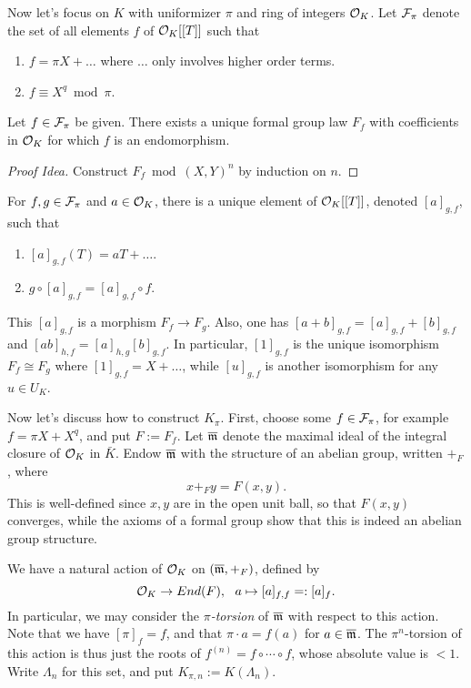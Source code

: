 Now let's focus on $K$ with uniformizer $\pi$ and ring of integers $\mathcal{O}_{K}$.
Let $\mathcal{F}_{\pi}$ denote the set of all elements $f$ of $\mathcal{O}_{K}[[T]]$ such that
\begin{enumerate}
  \item $f = \pi X + \ldots$ where $\ldots$ only involves higher order terms.
  \item $f \equiv X^{q} \bmod \pi$.
\end{enumerate}

\begin{theorem}
  Let $f \in \mathcal{F}_{\pi}$ be given.
  There exists a unique formal group law $F_{f}$ with coefficients in $\mathcal{O}_{K}$ for which $f$ is an endomorphism.
\end{theorem}
\begin{proof}[Proof Idea]
  Construct $F_{f} \bmod (X,Y)^{n}$ by induction on $n$.
\end{proof}

\begin{proposition}
  For $f,g \in \mathcal{F}_{\pi}$ and $a \in \mathcal{O}_{K}$, there is a unique element of $\mathcal{O}_{K}[[T]]$, denoted $[a]_{g,f}$, such that
  \begin{enumerate}
    \item $[a]_{g,f}(T) = aT + \ldots$.
    \item $g \circ [a]_{g,f} = [a]_{g,f} \circ f$.
  \end{enumerate}
  This $[a]_{g,f}$ is a morphism $F_{f} \to F_{g}$.
  Also, one has $[a+b]_{g,f} = [a]_{g,f} + [b]_{g,f}$ and $[ab]_{h,f} = [a]_{h,g}[b]_{g,f}$.
  In particular, $[1]_{g,f}$ is the unique isomorphism $F_{f} \cong F_{g}$ where $[1]_{g,f} = X + \ldots$, while $[u]_{g,f}$ is another isomorphism for any $u \in U_{K}$.
\end{proposition}

Now let's discuss how to construct $K_{\pi}$.
First, choose some $f \in \mathcal{F}_{\pi}$, for example $f = \pi X + X^{q}$, and put $F := F_{f}$.
Let $\overline{\mathfrak{m}}$ denote the maximal ideal of the integral closure of $\mathcal{O}_{K}$ in $\bar K$.
Endow $\overline{\mathfrak{m}}$ with the structure of an abelian group, written $+_{F}$, where
\[ x +_{F} y = F(x,y). \]
This is well-defined since $x,y$ are in the open unit ball, so that $F(x,y)$ converges, while the axioms of a formal group show that this is indeed an abelian group structure.

We have a natural action of $\mathcal{O}_{K}$ on $(\overline{\mathfrak{m}},+_{F})$, defined by
\[ \mathcal{O}_{K} \to End(F), \ \ a \mapsto [a]_{f,f} =: [a]_{f}. \]
In particular, we may consider the \emph{$\pi$-torsion} of $\overline{\mathfrak{m}}$ with respect to this action.
Note that we have $[\pi]_{f} = f$, and that $\pi \cdot a = f(a)$ for $a \in \overline {\mathfrak{m}}$.
The $\pi^{n}$-torsion of this action is thus just the roots of $f^{(n)} = f \circ \cdots \circ f$, whose absolute value is $< 1$.
Write $\Lambda_{n}$ for this set, and put $K_{\pi,n} := K(\Lambda_{n})$.


